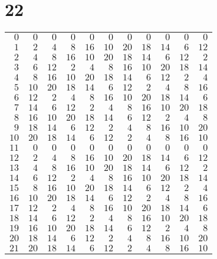 \documentclass[a4paper]{scrartcl}
\begin{document}
\section*{22}
\begin{tabular}{rrrrrrrrrrr}
\toprule
$0$ & $0$ & $0$ & $0$ & $0$ & $0$ & $0$ & $0$ & $0$ & $0$ & $0$ \\
$1$ & $2$ & $4$ & $8$ & $16$ & $10$ & $20$ & $18$ & $14$ & $6$ & $12$ \\
$2$ & $4$ & $8$ & $16$ & $10$ & $20$ & $18$ & $14$ & $6$ & $12$ & $2$ \\
$3$ & $6$ & $12$ & $2$ & $4$ & $8$ & $16$ & $10$ & $20$ & $18$ & $14$ \\
$4$ & $8$ & $16$ & $10$ & $20$ & $18$ & $14$ & $6$ & $12$ & $2$ & $4$ \\
$5$ & $10$ & $20$ & $18$ & $14$ & $6$ & $12$ & $2$ & $4$ & $8$ & $16$ \\
$6$ & $12$ & $2$ & $4$ & $8$ & $16$ & $10$ & $20$ & $18$ & $14$ & $6$ \\
$7$ & $14$ & $6$ & $12$ & $2$ & $4$ & $8$ & $16$ & $10$ & $20$ & $18$ \\
$8$ & $16$ & $10$ & $20$ & $18$ & $14$ & $6$ & $12$ & $2$ & $4$ & $8$ \\
$9$ & $18$ & $14$ & $6$ & $12$ & $2$ & $4$ & $8$ & $16$ & $10$ & $20$ \\
$10$ & $20$ & $18$ & $14$ & $6$ & $12$ & $2$ & $4$ & $8$ & $16$ & $10$ \\
$11$ & $0$ & $0$ & $0$ & $0$ & $0$ & $0$ & $0$ & $0$ & $0$ & $0$ \\
$12$ & $2$ & $4$ & $8$ & $16$ & $10$ & $20$ & $18$ & $14$ & $6$ & $12$ \\
$13$ & $4$ & $8$ & $16$ & $10$ & $20$ & $18$ & $14$ & $6$ & $12$ & $2$ \\
$14$ & $6$ & $12$ & $2$ & $4$ & $8$ & $16$ & $10$ & $20$ & $18$ & $14$ \\
$15$ & $8$ & $16$ & $10$ & $20$ & $18$ & $14$ & $6$ & $12$ & $2$ & $4$ \\
$16$ & $10$ & $20$ & $18$ & $14$ & $6$ & $12$ & $2$ & $4$ & $8$ & $16$ \\
$17$ & $12$ & $2$ & $4$ & $8$ & $16$ & $10$ & $20$ & $18$ & $14$ & $6$ \\
$18$ & $14$ & $6$ & $12$ & $2$ & $4$ & $8$ & $16$ & $10$ & $20$ & $18$ \\
$19$ & $16$ & $10$ & $20$ & $18$ & $14$ & $6$ & $12$ & $2$ & $4$ & $8$ \\
$20$ & $18$ & $14$ & $6$ & $12$ & $2$ & $4$ & $8$ & $16$ & $10$ & $20$ \\
$21$ & $20$ & $18$ & $14$ & $6$ & $12$ & $2$ & $4$ & $8$ & $16$ & $10$ \\
\bottomrule
\end{tabular}
\end{document}
